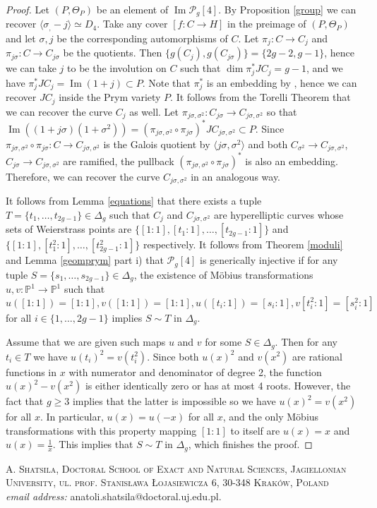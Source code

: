 \documentclass{article}
\numberwithin{equation}{section}
\newcommand{\s}{\sigma}
\DeclareMathOperator{\Image}{Im}
\begin{document}
\begin{proof}
    Let $(P, \Theta_P)$ be an element of $\Image\mathcal{P}_g[4]$. By Proposition \ref{group} we can recover $\langle \sigma_, -j \rangle \simeq D_4$. Take any cover $[f: C \to H]$ in the preimage of $(P, \Theta_P)$ and let $\sigma, j$ be the corresponding automorphisms of $C$. Let $\pi_j: C \to C_j$ and $\pi_{j\sigma}:C \to C_{j\s}$ be the quotients. Then $\{g(C_{j}), g(C_{j\s})\} = \{2g-2, g-1\}$, hence we can take $j$ to be the involution on $C$ such that $\dim \pi_j^*JC_j = g-1$, and we have $\pi_j^*JC_j = \Image(1+j) \subset P$. Note that $\pi_j^*$ is an embedding by \cite[Proposition 11.4.3]{BL}, hence we can recover $JC_j$ inside the Prym variety $P$. It follows from the Torelli Theorem that we can recover the curve $C_j$ as well. Let $\pi_{j\s, \s^2}:C_{j\s} \to C_{j\s, \s^2}$ so that $\Image((1+j\s)(1+\s^2)) = (\pi_{j\s,\s^2}\circ\pi_{j\s})^*JC_{j\s, \s^2} \subset P$. Since $\pi_{j\s,\s^2}\circ\pi_{j\s}: C \to C_{j\s, \s^2}$ is the Galois quotient by $\langle j\s, \s^2 \rangle$ and both $C_{\sigma^2} \to C_{j\s, \s^2}$,  $C_{j\s} \to C_{j\s, \s^2}$ are ramified, the pullback $(\pi_{j\s,\s^2}\circ\pi_{j\s})^*$ is also an embedding. Therefore, we can recover the curve $C_{j\s, \s^2}$ in an analogous way. 

    It follows from Lemma \ref{equations} that there exists a tuple $T = \{t_1, \ldots, t_{2g-1}\} \in \Delta_g$ such that $C_{j}$ and $C_{j\s, \s^2}$ are hyperelliptic curves whose sets of Weierstrass points are $\{[1:1], [t_1:1], \ldots, [t_{2g-1}:1]\}$ and $\{[1:1], [t_1^2:1], \ldots, [t_{2g-1}^2:1]\}$ respectively. It follows from Theorem \ref{moduli} and Lemma \ref{geomprym} part i) that $\mathcal{P}_g[4]$ is generically injective if for any tuple $S = \{s_1, \ldots, s_{2g-1}\} \in \Delta_g$, the existence of Möbius transformations $u, v: \mathbb{P}^1 \to \mathbb{P}^1$ such that $$u([1:1]) = [1:1], v([1:1]) = [1:1], u([t_i:1]) = [s_i:1], v[t_i^2:1] = [s_i^2:1]$$ for all $i \in \{1,\ldots, 2g-1\}$ implies 
    $S \sim T$ in $\Delta_g$. 

    Assume that we are given such maps $u$ and $v$ for some $S \in \Delta_g$. Then for any $t_i \in T$ we have $u(t_i)^2 = v(t_i^2)$. Since both $u(x)^2$ and $v(x^2)$ are rational functions in $x$ with numerator and denominator of degree 2, the function $u(x)^2 - v(x^2)$ is either identically zero or has at most 4 roots. However, the fact that $g \geq 3$ implies that the latter is impossible so we have $u(x)^2 = v(x^2)$ for all $x$. In particular, $u(x) = u(-x)$ for all $x$, and the only Möbius transformations with this property mapping $[1:1]$ to itself are $u(x) = x$ and $u(x) = \frac{1}{x}$. This implies that $S \sim T$ in $\Delta_g$, which finishes the proof.
      
\end{proof}




\textsc{A. Shatsila, Doctoral School of Exact and Natural Sciences, Jagiellonian University, ul. prof. Stanisława Łojasiewicza 6, 30-348 Kraków, Poland}\\
\textit{email address:} anatoli.shatsila@doctoral.uj.edu.pl.
\end{document}
